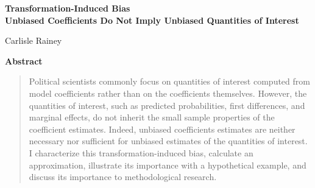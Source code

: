 \documentclass[12pt]{article}
\begin{document}
\begin{center}
{\LARGE \textbf{Transformation-Induced Bias}}\\\vspace{2mm}
{ \textbf{Unbiased Coefficients Do Not Imply Unbiased Quantities of Interest}}

\vspace{5mm}

Carlisle Rainey
\end{center}

\vspace{5mm}

{\centerline{\textbf{Abstract}}}
\begin{quote}\noindent
Political scientists commonly focus on quantities of interest computed from model coefficients rather than on the coefficients themselves. 
However, the quantities of interest, such as predicted probabilities, first differences, and marginal effects, do not inherit the small sample properties of the coefficient estimates. 
Indeed, unbiased coefficients estimates are neither necessary nor sufficient for unbiased estimates of the quantities of interest. 
I characterize this transformation-induced bias, calculate an approximation, illustrate its importance with a hypothetical example, and discuss its importance to methodological research.
 \end{quote}



\thispagestyle{empty}

\doublespace

\end{document}
